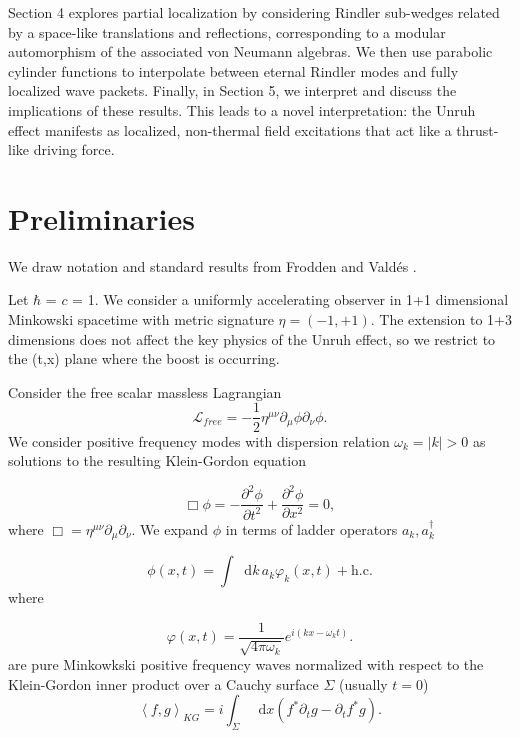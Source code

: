 \documentclass[12pt,a4paper]{article}
\newcommand*\diff{\mathop{}\!\mathrm{d}}
\begin{document}
Section 4 explores partial localization by considering Rindler sub-wedges related by a space-like translations and reflections, corresponding to a modular automorphism of the associated von Neumann algebras. We then use parabolic cylinder functions to interpolate between eternal Rindler modes and fully localized wave packets. Finally, in Section 5, we interpret and discuss the implications of these results. This leads to a novel interpretation: the Unruh effect manifests as localized, non-thermal field excitations that act like a thrust-like driving force.

\section{Preliminaries}

We draw notation and standard results from Frodden and Vald{\'{e}}s \cite{Frodden}.


Let $\hbar$ = $c$ = 1. We consider a uniformly accelerating observer in 1+1 dimensional Minkowski spacetime with metric signature $\eta=(-1,+1)$. The extension to 1+3 dimensions does not affect the key physics of the Unruh effect, so we restrict to the (t,x) plane where the boost is occurring.

Consider the free scalar massless Lagrangian
\begin{equation}
\mathscr{L}_{free} = -\frac{1}{2} \eta^{\mu\nu}\partial_\mu \phi \partial_\nu \phi.
\end{equation}
We consider positive frequency modes with dispersion relation $\omega_k = |k| > 0$ as solutions to the resulting Klein-Gordon equation 

\begin{equation}
  \Box \phi = -\frac{\partial^2 \phi}{\partial t^2} + \frac{\partial^2 \phi}{\partial x^2} = 0,
 \label{massless-wave-eq}
\end{equation}
where $\Box = \eta^{\mu\nu} \partial_\mu \partial_\nu$. We expand $\phi$ in terms of ladder operators $a_k, a_k^\dagger$

\begin{equation}
  \phi(x,t) = \int \diff k \, a_k \varphi_k(x,t) + \text{h.c.}
\end{equation}
where

\begin{equation}
  \varphi(x,t) = \frac{1}{\sqrt{4\pi\omega_k}} e^{i(kx - \omega_k t)}.
\label{amode}
\end{equation}
are pure Minkowkski positive frequency waves normalized with respect to the Klein-Gordon inner product over a Cauchy surface $\Sigma$ (usually $t = 0$)
\begin{equation}
  \left<f, g\right>_{KG} = i \int_\Sigma \diff x (f^* \partial_t g - \partial_t f^* g).
\end{equation}
\end{document}
